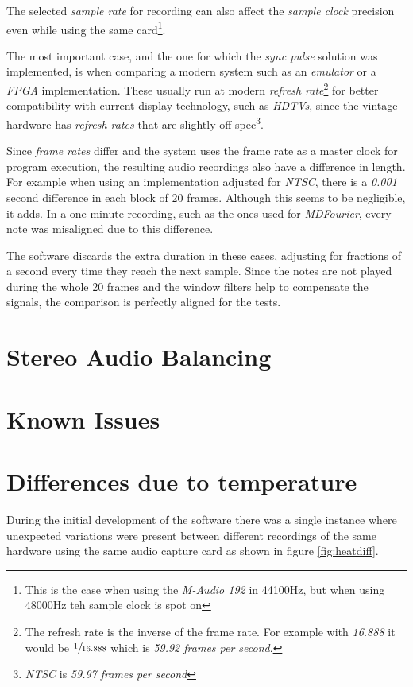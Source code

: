\documentclass[10pt,a4paper]{report}
\begin{document}
\begin{appendices}
The selected \textit{sample rate} for recording can also affect the \textit{sample clock} precision even while using the same card\footnote{This is the case when using the \textit{M-Audio 192} \cite{maudio} in 44100Hz, but when using 48000Hz teh sample clock is spot on}.

The most important case, and the one for which the \textit{sync pulse} solution was implemented, is when comparing a modern system such as an \textit{emulator} or a \textit{FPGA} implementation. These usually run at modern \textit{refresh rate}\footnote{The refresh rate is the inverse of the frame rate. For example with \textit{16.888} it would be $\sfrac{1}{16.888}$ which is \textit{59.92 frames per second}.} for better compatibility with current display technology, such as \textit{HDTVs}, since the vintage hardware has \textit{refresh rates} that are slightly off-spec\footnote{\textit{NTSC} is \textit{59.97 frames per second}}.

Since \textit{frame rates} differ and the system uses the frame rate as a master clock for program execution, the resulting audio recordings also have a difference in length. For example when using an implementation adjusted for \textit{NTSC}, there is a \textit{0.001} second difference in each block of 20 frames. Although this seems to be negligible, it adds. In a one minute recording, such as the ones used for \textit{MDFourier}, every note was misaligned due to this difference.

The software discards the extra duration in these cases, adjusting for fractions of a second every time they reach the next sample. Since the notes are not played during the whole 20 frames and the window filters help to compensate the signals, the comparison is perfectly aligned for the tests.

\chapter{Stereo Audio Balancing}

\chapter{Known Issues}

\chapter{Differences due to temperature}

During the initial development of the software there was a single instance where unexpected variations were present between different recordings of the same hardware using the same audio capture card as shown in figure \ref{fig:heatdiff}.


\end{appendices}
\end{document}
